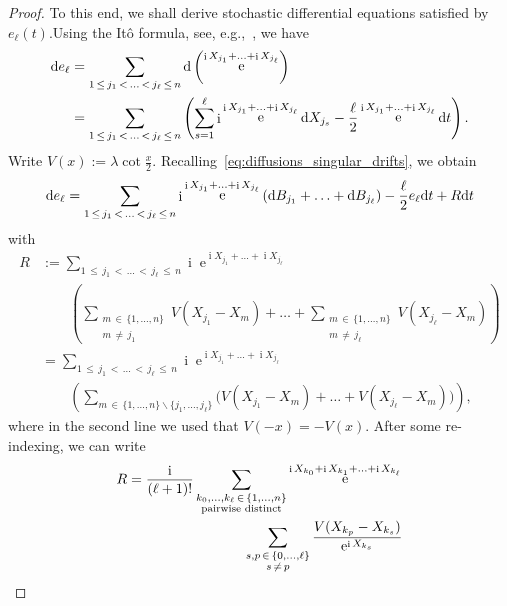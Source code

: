 \documentclass[AHL,Unicode,longabstracts,published]{cedram}
\DeclareMathOperator{\eee}{e}
\DeclareMathOperator{\ii}{i}
\newcommand*\dint{\text{\normalfont d}}
\begin{document}
\begin{proof}
To this end, we shall derive stochastic differential equations satisfied by $e_\ell(t)$.\linebreak Using the Itô formula, see, e.g.,~\cite[Chapter~IV, Theorem~(3.3)]{revuz_yor_book}, we have
\begin{align*}
\dint e_\ell &=
\sum_{1\,\leq\,j_1\,<\,\ldots\,<\,j_\ell\,\leq\,n} \dint \left(\eee^{\ii X_{j_1} +\ldots + \ii X_{j_\ell}}\right)\\
&=
\sum_{1\,\leq\,j_1\,<\,\ldots\,<\,j_\ell\,\leq\,n}
\left(\sum_{s=1}^\ell \ii \eee^{\ii X_{j_1} +\ldots + \ii X_{j_\ell}}\dint X_{j_s} -\frac {\ell}2 \eee^{\ii X_{j_1} +\ldots + \ii X_{j_\ell}} \dint t
\right).
\end{align*}
Write $V(x) := \lambda \cot \frac x2$. Recalling~\eqref{eq:diffusions_singular_drifts}, we obtain
\begin{equation}\label{eq:elem_symm_SDE1}
\dint e_\ell = \sum_{1\,\leq\,j_1\,<\,\ldots\,<\,j_\ell\,\leq\,n} \ii \eee^{\ii X_{j_1} +\ldots + \ii X_{j_\ell}} \left(\dint B_{j_1} +\ldots + \dint B_{j_\ell} \right) - \frac \ell 2 e_\ell \dint t + R \dint t
\end{equation}
with
\begin{align*}
R &:=
\sum_{1\,\leq\,j_1\,<\,\ldots\,<\,j_\ell\,\leq\,n} \ii \eee^{\ii X_{j_1} +\ldots + \ii X_{j_\ell}}\\
&\qquad \left(\sum_{\substack{m\,\in\,\{1,\ldots, n\}\\ m\,\neq\,j_1}} V(X_{j_1} - X_m) + \ldots + \sum_{\substack{m\,\in\,\{1,\ldots, n\}\\ m\,\neq\, j_\ell}} V(X_{j_\ell} - X_m)\right)\\
&=
\sum_{1\,\leq\,j_1\,<\,\ldots\,<\,j_\ell\,\leq\,n} \ii \eee^{\ii X_{j_1} +\ldots + \ii X_{j_\ell}}\\
&\qquad\left(\sum_{m\,\in\,\{1,\ldots, n\}\backslash \{j_1,\ldots, j_\ell\}} \Big(V(X_{j_1} - X_m) + \ldots + V(X_{j_\ell} - X_m)\Big) \right),
\end{align*}
where in the second line we used that $V(-x) = -V(x)$. After some re-indexing, we can write
\begin{align*}
R &=
\frac{\ii}{(\ell+1)!}\sum_{\substack{k_0,\ldots, k_\ell\,\in\,\{1,\ldots, n\}\\
\text{pairwise distinct}}}\eee^{\ii X_{k_0} + \ii X_{k_1} + \ldots + \ii X_{k_\ell}}\\
&\mkern150mu\sum_{\substack{s,p\,\in\,\{0,\ldots,\ell\}\\s\,\neq\,p}} \frac{V(X_{k_p} - X_{k_s})}{\eee^{\ii X_{k_s}}}\\

\end{align*}
\end{proof}
\end{document}
